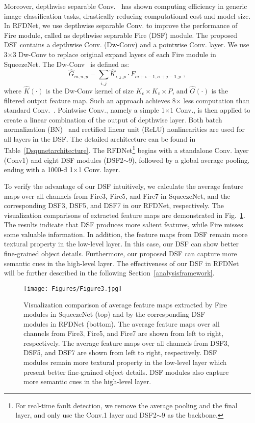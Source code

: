 Moreover, depthwise separable Conv.~\cite{sandler2018inverted} has shown computing efficiency in generic image classification tasks, drastically reducing computational cost and model size. In RFDNet, we use depthwise separable Conv. to improve the performance of Fire module, called as depthwise separable Fire (DSF) module. The proposed DSF contains a depthwise Conv. (Dw-Conv) and a pointwise Conv. layer. We use 3$\times$3 Dw-Conv to replace original expand layers of each Fire module in SqueezeNet. The Dw-Conv~\cite{sandler2018inverted} is defined as:
\begin{equation}
\hat{G}_{m, n, p}=\sum_{i,j} \hat{K}_{i, j, p}\cdot F_{m+i-1, n+j-1, p} \;,
\end{equation}
where $\hat{K}(\cdot)$ is the Dw-Conv kernel of size $K_c\times K_c\times P$, and $\hat{G}(\cdot)$ is the filtered output feature map. Such an approach achieves 8$\times$ less computation than standard Conv.~\cite{sandler2018inverted}. Pointwise Conv., namely a simple 1$\times$1 Conv., is then applied to create a linear combination of the output of depthwise layer. Both batch normalization (BN)~\cite{Ioffe2015Batch} and rectified linear unit (ReLU) nonlinearities are used for all layers in the DSF. The detailed architecture can be found in Table~\ref{Dsqunetarchitecture}. The RFDNet\footnote{For real-time fault detection, we remove the average pooling and the final layer, and only use the Conv.1 layer and DSF2$\sim$9 as the backbone.} begins with a standalone Conv. layer (Conv1) and eight DSF modules (DSF2$\sim$9), followed by a global average pooling, ending with a 1000-d 1$\times$1 Conv. layer.

To verify the advantage of our DSF intuitively, we calculate the average feature maps over all channels from Fire3, Fire5, and Fire7 in SqueezeNet, and the corresponding DSF3, DSF5, and DSF7 in our RFDNet, respectively. The visualization comparisons of extracted feature maps are demonstrated in Fig.~\ref{fig:RFDNet_vis}. The results indicate that DSF produces more salient features, while Fire misses some valuable information. In addition, the feature maps from DSF remain more textural property in the low-level layer. In this case, our DSF can show better fine-grained object details. Furthermore, our proposed DSF can capture more semantic cues in the high-level layer. The effectiveness of our DSF in RFDNet will be further described in the following Section~\ref{analysisframework}.

\begin{figure}[!t]
	\centering
    \texttt{[image: Figures/Figure3.jpg]}
	\caption{Visualization comparison of average feature maps extracted by Fire modules in SqueezeNet (top) and by the corresponding DSF modules in RFDNet (bottom). The average feature maps over all channels from Fire3, Fire5, and Fire7 are shown from left to right, respectively. The average feature maps over all channels from DSF3, DSF5, and DSF7 are shown from left to right, respectively. DSF modules remain more textural property in the low-level layer which present better fine-grained object details. DSF modules also capture more semantic cues in the high-level layer.}
	\label{fig:RFDNet_vis}
\end{figure}

